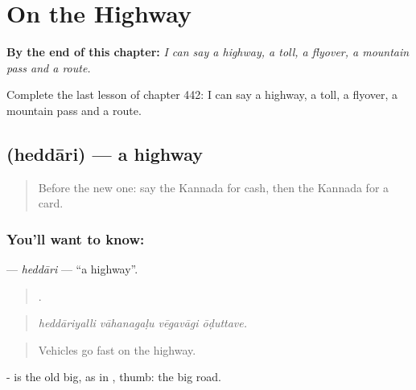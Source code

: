 
\chapter{On the Highway}
\label{ch:ka-on-the-highway}

\begin{chapteropening}
\textbf{By the end of this chapter:} \emph{I can say a highway, a toll, a flyover, a mountain pass and a route.}

Complete the last lesson of chapter 442: I can say a highway, a toll, a flyover, a mountain pass and a route.
\end{chapteropening}

\section[\texorpdfstring{\kn{ಹೆದ್ದಾರಿ} (heddāri)}{ಹೆದ್ದಾರಿ (heddāri)}]{ (heddāri) — a highway}

\label{lesson:KA-C442-heddari}



\begin{quote}
Before the new one: say the Kannada for cash, then the Kannada for a card.
\end{quote}

\subsection*{You'll want to know: }
\textbf{} — \emph{heddāri} — \textquotedblleft{}a highway\textquotedblright{}.

\begin{quote}
   .
\end{quote}

\begin{quote}
\emph{heddāriyalli vāhanagaḷu vēgavāgi ōḍuttave.}
\end{quote}

\begin{quote}
Vehicles go fast on the highway.
\end{quote}

- is the old big, as in , thumb: the big road.

